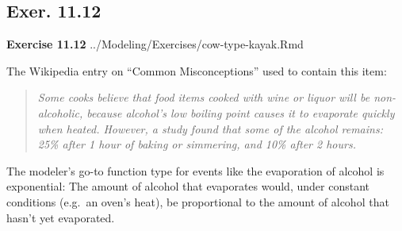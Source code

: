 \documentclass[
  letterpaper,
  DIV=11,
  numbers=noendperiod,
  oneside]{article}
\begin{document}
\begin{multicols}{2}
\begin{table}
\begin{minipage}[t]{\linewidth}
{}

\end{minipage}%
\newline
\begin{minipage}[t]{\linewidth}

{\centering 

\hypertarget{exer.-11.12}{%
\section*{Exer. 11.12}\label{exer.-11.12}}

\textbf{Exercise 11.12} ../Modeling/Exercises/cow-type-kayak.Rmd

}

\end{minipage}%
\newline
\begin{minipage}[t]{\linewidth}

{\centering 

The Wikipedia entry on ``Common Misconceptions'' used to contain this
item:

}

\end{minipage}%
\newline
\begin{minipage}[t]{\linewidth}

{\centering 

\begin{quote}
\emph{Some cooks believe that food items cooked with wine or liquor will
be non-alcoholic, because alcohol's low boiling point causes it to
evaporate quickly when heated. However, a study found that some of the
alcohol remains: 25\% after 1 hour of baking or simmering, and 10\%
after 2 hours.}
\end{quote}

}

\end{minipage}%
\newline
\begin{minipage}[t]{\linewidth}

{\centering 

The modeler's go-to function type for events like the evaporation of
alcohol is exponential: The amount of alcohol that evaporates would,
under constant conditions (e.g.~an oven's heat), be proportional to the
amount of alcohol that hasn't yet evaporated.

}

\end{minipage}%
\newline
\begin{minipage}[t]{\linewidth}


\end{minipage}
\end{table}
\end{multicols}
\end{document}
